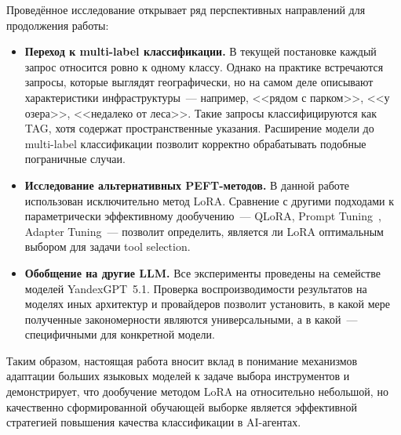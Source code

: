 Проведённое исследование открывает ряд перспективных направлений для продолжения работы:
\begin{itemize}
    \item \textbf{Переход к multi-label классификации.} В текущей постановке каждый запрос относится ровно к одному классу. Однако на практике встречаются запросы, которые выглядят географически, но на самом деле описывают характеристики инфраструктуры~--- например, <<рядом с парком>>, <<у озера>>, <<недалеко от леса>>. Такие запросы классифицируются как TAG, хотя содержат пространственные указания. Расширение модели до multi-label классификации позволит корректно обрабатывать подобные пограничные случаи.

    \item \textbf{Исследование альтернативных PEFT-методов.} В данной работе использован исключительно метод LoRA. Сравнение с другими подходами к параметрически эффективному дообучению~--- QLoRA, Prompt Tuning~\cite{lester2021power}, Adapter Tuning~--- позволит определить, является ли LoRA оптимальным выбором для задачи tool selection.

    \item \textbf{Обобщение на другие LLM.} Все эксперименты проведены на семействе моделей YandexGPT~5.1. Проверка воспроизводимости результатов на моделях иных архитектур и провайдеров позволит установить, в какой мере полученные закономерности являются универсальными, а в какой~--- специфичными для конкретной модели.
\end{itemize}

Таким образом, настоящая работа вносит вклад в понимание механизмов адаптации больших языковых моделей к задаче выбора инструментов и демонстрирует, что дообучение методом LoRA на относительно небольшой, но качественно сформированной обучающей выборке является эффективной стратегией повышения качества классификации в AI-агентах.
